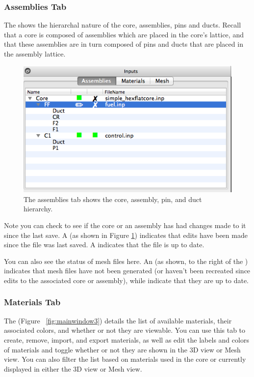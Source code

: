 \subsubsection{Assemblies Tab}
The  shows the hierarchal nature of the core, assemblies, pins and ducts.  Recall that a core is composed of assemblies which are placed in the core's lattice, and that these assemblies are in turn composed of pins and ducts that are placed in the assembly lattice.

\begin{figure}[H]
	\begin{center}
		\includegraphics[width=0.5\linewidth]{Images/assemblies-tab.png}
		\caption{The assemblies tab shows the core, assembly, pin, and duct hierarchy.}
		\label{fig:mainwindow2}
	\end{center}
\end{figure}

Note you can check to see if the core or an assembly has had changes made to it since the last save.  A  (as shown in Figure \ref{fig:mainwindow2}) indicates that edits have been made since the file was last saved.  A  indicates that the file is up to date.

You can also see the status of mesh files here.  An  (as shown, to the right of the ) indicates that mesh files have not been generated (or haven't been recreated since edits to the associated core or assembly), while  indicate that they are up to date.

\subsubsection{Materials Tab}
The  (Figure ~\ref{fig:mainwindow3}) details the list of available materials, their associated colors, and whether or not they are viewable.  You can use this tab to create, remove, import, and export materials, as well as edit the labels and colors of materials and toggle whether or not they are shown in the 3D view or Mesh view.  You can also filter the list based on materials used in the core or currently displayed in either the 3D view or Mesh view.

